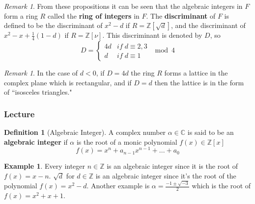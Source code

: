 \documentclass[12pt]{article}
\theoremstyle{definition}
\newtheorem{defn}[thm]{Definition}
\newtheorem{eg}[thm]{Example}
\theoremstyle{remark}
\newtheorem{rmk}[thm]{Remark}
\numberwithin{equation}{section}
\newcommand\C{\mathbb C}    %
\newcommand\Z{\mathbb Z}    %
\newcommand\B[1]{\textbf{ #1}}
\begin{document}
\vspace{15pt}

\begin{rmk}
        From these propositions it can be seen that the algebraic integers in $F$ form a ring $R$ called the \B{ring of integers} in $F$. The \B{discriminant} of $F$ is defined to be the discriminant of $x^2 - d$ if $R = \Z[\sqrt{d}]$, and the discriminant of $x^2 - x + \frac{1}{4}(1-d)$ if $R = \Z[\nu]$. This discriminant is denoted by $D$, so \begin{equation}
                D = \left\{\begin{array}{cc} 4d & if\;d \equiv 2,3 \\ d & if\;d\equiv 1 \end{array}\right.\mod 4
        \end{equation}
\end{rmk}


\vspace{15pt}

\begin{rmk}
        In the case of $d <0$, if $D = 4d$ the ring $R$ forms a lattice in the complex plane which is rectangular, and if $D = d$ then the lattice is in the form of ``isosceles triangles."
\end{rmk}


\vspace{15pt}

\subsubsection{Lecture}

\begin{defn}[Algebraic Integer]
        A complex number $\alpha \in \C$ is said to be an \B{algebraic integer} if $\alpha$ is the root of a monic polynomial $f(x) \in \Z[x]$ \begin{equation}
                f(x) = x^n + a_{n-1}x^{n-1}+...+a_0
        \end{equation}
\end{defn}

\vspace{15pt}

\begin{eg}
        Every integer $n \in \Z$ is an algebraic integer since it is the root of $f(x) = x-n$. $\sqrt{d}$ for $d \in \Z$ is an algebraic integer since it's the root of the polynomial $f(x) = x^2 -d$. Another example is $\alpha = \frac{-1\pm \sqrt{-3}}{2}$ which is the root of $f(x) = x^2+x+1$.
\end{eg}
\end{document}
